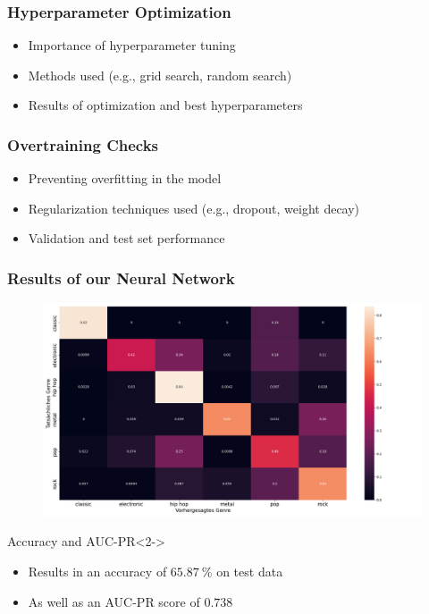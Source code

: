 \documentclass[8pt]{beamer}
\begin{document}
\begin{frame}
\frametitle{Hyperparameter Optimization}

\begin{itemize}
\item Importance of hyperparameter tuning
\item Methods used (e.g., grid search, random search)
\item Results of optimization and best hyperparameters
\end{itemize}

\end{frame}

\begin{frame}
\frametitle{Overtraining Checks}

\begin{itemize}
\item Preventing overfitting in the model
\item Regularization techniques used (e.g., dropout, weight decay)
\item Validation and test set performance
\end{itemize}

\end{frame}

\begin{frame}
\frametitle{Results of our Neural Network}
\begin{figure}<1>
  \centering
  \includegraphics[scale=0.32]{figures/confusion_matrix_NN.png}
\end{figure}
\begin{alertblock}{Accuracy and AUC-PR}<2->
	\begin{itemize}
   \item Results in an accuracy of $\SI{65.87}{\percent}$ on test data
   \item As well as an AUC-PR score of $\num{0.738}$
  \end{itemize}
\end{alertblock}
\end{frame}
\end{document}
